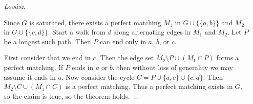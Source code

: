 \documentclass[12pt, a4paper]{book}
\theoremstyle{nonumberplain}
\newtheorem{proof}{Proof}
\begin{document}
\begin{proof}[Lov\'asz]
\begin{center}
    \end{center}
    Since $G$ is saturated, there exists a perfect matching $M_1$ in $G\cup\{\{a,b\}\}$ and $M_2$ in $G\cup\{\{c,d\}\}$.
    Start a walk from $d$ along alternating edges in $M_1$ and $M_2$.
    Let $P$ be a longest such path.
    Then $P$ can end only in $a$, $b$, or $c$.

    First consider that we end in $c$.
    Then the edge set $M_2\setminus P\cup(M_1\cap P)$ forms a perfect matching.
    If $P$ ends in $a$ or $b$, then without loss of generality we may assume it ends in $a$.
    Now consider the cycle $C=P\cup\{a,c\}\cup\{c,d\}$.
    Then $M_2\setminus C\cup (M_1\cap C)$ is a perfect matching.
    Thus a perfect matching exists in $G$, so the claim is true, so the theorem holds.
\end{proof}
\end{document}
